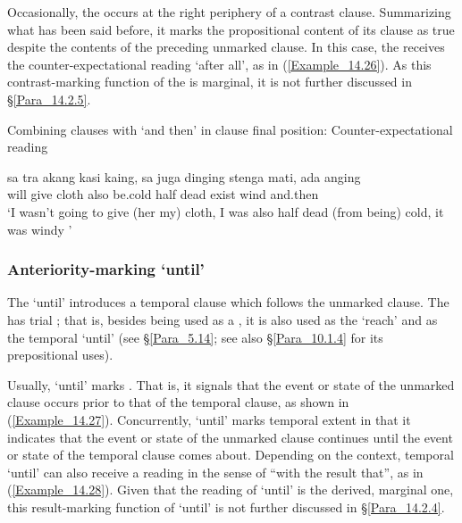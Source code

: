 Occasionally, the  occurs at the right periphery of a contrast clause. Summarizing what has been said before, it marks the propositional content of its clause as true despite the contents of the preceding unmarked clause. In this case, the  receives the counter-expectational reading ‘after all’, as in (\ref{Example_14.26}). As this contrast-marking function of the  is marginal, it is not further discussed in §\ref{Para_14.2.5}.

\begin{styleExampleTitle}
Combining clauses with  ‘and then’ in clause final position: Counter-expectational reading
\end{styleExampleTitle}

\ea\label{Example_14.26}

\gll sa  tra  akang  kasi  kaing,  sa  juga  dinging  stenga  mati,   ada  anging  \\  
    will  give  cloth    also  be.cold  half  dead   exist  wind  and.then\\
\glt ‘I wasn’t going to give (her my) cloth, I was also half dead (from being) cold, it was windy ’ \textstyleExampleSource{[081025-006-Cv.0048]}
\z

\subsubsection[Anteriority{}-marking sampe ‘until’]{Anteriority-marking  ‘until’}
\label{Para_14.2.3.3}
The   ‘until’ introduces a temporal clause which follows the unmarked clause. The  has trial ; that is, besides being used as a , it is also used as the    ‘reach’ and as the temporal   ‘until’ (see §\ref{Para_5.14}; see also §\ref{Para_10.1.4} for its prepositional uses).

Usually,  ‘until’ marks . That is, it signals that the event or state of the unmarked clause occurs prior to that of the temporal clause, as shown in (\ref{Example_14.27}). Concurrently,  ‘until’ marks temporal extent in that it indicates that the event or state of the unmarked clause continues until the event or state of the temporal clause comes about. Depending on the context, temporal  ‘until’ can also receive a  reading in the sense of ``with the result that'', as in (\ref{Example_14.28}). Given that the  reading of  ‘until’ is the derived, marginal one, this result-marking function of  ‘until’ is not further discussed in §\ref{Para_14.2.4}.


